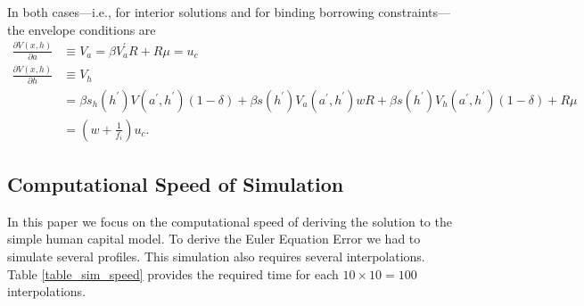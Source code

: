 \documentclass[a4paper,12pt]{article}
\begin{document}
In both cases---i.e., for interior solutions and for binding borrowing constraints---the envelope conditions are
\begin{align*}
	\frac{\partial V\left(x,h\right)} {\partial a}  &  \equiv V_{a} = \beta V_{a}^{\prime} R + R \mu = u_{c}  \\
	\frac{\partial V\left(x,h\right)} {\partial h}  &  \equiv V_{h}  \\
	&  = \beta s_{h}\left(h^{\prime}\right) V(a^{\prime},h^{\prime}) \left(1 - \delta\right) +\beta s\left(h^{\prime}\right) V_{a}(a^{\prime},h^{\prime}) w R + \beta s\left(h^{\prime}\right) V_{h}(a^{\prime},h^{\prime}) \left(1 - \delta\right) + R \mu \\
	&  = \left(w + \frac{1} {f_{i}}\right) u_{c}.
\end{align*}

\subsection*{Computational Speed of Simulation}

In this paper we focus on the computational speed of deriving the solution to the simple human capital model. To derive the Euler Equation Error we had to simulate several profiles. This simulation also requires several interpolations. Table \ref{table_sim_speed} provides the required time for each $10\times10=100$ interpolations.
\end{document}
